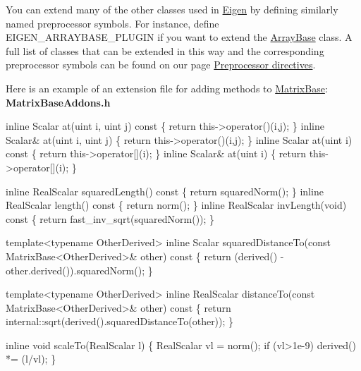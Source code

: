 You can extend many of the other classes used in \hyperlink{namespace_eigen}{Eigen} by defining similarly named preprocessor symbols. For instance, define {\ttfamily E\+I\+G\+E\+N\+\_\+\+A\+R\+R\+A\+Y\+B\+A\+S\+E\+\_\+\+P\+L\+U\+G\+IN} if you want to extend the \hyperlink{group___core___module_class_eigen_1_1_array_base}{Array\+Base} class. A full list of classes that can be extended in this way and the corresponding preprocessor symbols can be found on our page \hyperlink{TopicPreprocessorDirectives}{Preprocessor directives}.

Here is an example of an extension file for adding methods to \hyperlink{group___core___module_class_eigen_1_1_matrix_base}{Matrix\+Base}\+: ~\newline
{\bfseries Matrix\+Base\+Addons.\+h} 
\begin{DoxyCode}
\textcolor{keyword}{inline} Scalar at(uint i, uint j)\textcolor{keyword}{ const }\{ \textcolor{keywordflow}{return} this->operator()(i,j); \}
\textcolor{keyword}{inline} Scalar& at(uint i, uint j) \{ \textcolor{keywordflow}{return} this->operator()(i,j); \}
\textcolor{keyword}{inline} Scalar at(uint i)\textcolor{keyword}{ const }\{ \textcolor{keywordflow}{return} this->operator[](i); \}
\textcolor{keyword}{inline} Scalar& at(uint i) \{ \textcolor{keywordflow}{return} this->operator[](i); \}

\textcolor{keyword}{inline} RealScalar squaredLength()\textcolor{keyword}{ const }\{ \textcolor{keywordflow}{return} squaredNorm(); \}
\textcolor{keyword}{inline} RealScalar length()\textcolor{keyword}{ const }\{ \textcolor{keywordflow}{return} norm(); \}
\textcolor{keyword}{inline} RealScalar invLength(\textcolor{keywordtype}{void})\textcolor{keyword}{ const }\{ \textcolor{keywordflow}{return} fast\_inv\_sqrt(squaredNorm()); \}

\textcolor{keyword}{template}<\textcolor{keyword}{typename} OtherDerived>
\textcolor{keyword}{inline} Scalar squaredDistanceTo(\textcolor{keyword}{const} MatrixBase<OtherDerived>& other)\textcolor{keyword}{ const}
\textcolor{keyword}{}\{ \textcolor{keywordflow}{return} (derived() - other.derived()).squaredNorm(); \}

\textcolor{keyword}{template}<\textcolor{keyword}{typename} OtherDerived>
\textcolor{keyword}{inline} RealScalar distanceTo(\textcolor{keyword}{const} MatrixBase<OtherDerived>& other)\textcolor{keyword}{ const}
\textcolor{keyword}{}\{ \textcolor{keywordflow}{return} internal::sqrt(derived().squaredDistanceTo(other)); \}

\textcolor{keyword}{inline} \textcolor{keywordtype}{void} scaleTo(RealScalar l) \{ RealScalar vl = norm(); \textcolor{keywordflow}{if} (vl>1e-9) derived() *= (l/vl); \}


\end{DoxyCode}
